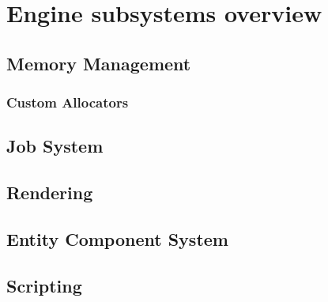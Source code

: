 \section{Engine subsystems overview}
\blindtext
\subsection{Memory Management}
\blindtext
\subsubsection{Custom Allocators}
\blindtext
\subsection{Job System}
\blindtext
\subsection{Rendering}
\blindtext
\subsection{Entity Component System}
\blindtext
\subsection{Scripting}
\blindtext